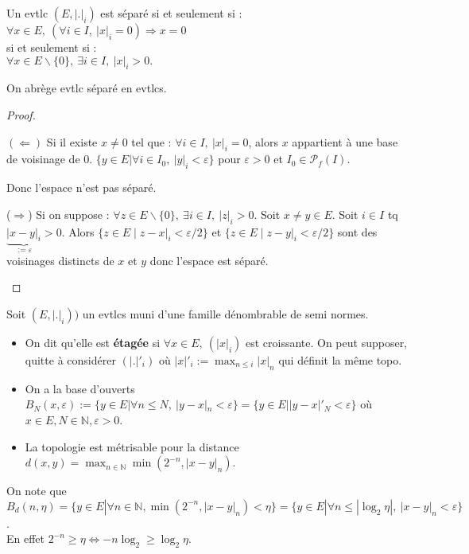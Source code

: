 \begin{lemme}\label{Lemme 1}
    Un evtlc $(E,|.|_i)$ est séparé si et seulement si : \\
    $\forall x\in E, \ (\forall i\in I,\ |x|_i=0)\Rightarrow x=0  $ \\
    si et seulement si : \\
    $\forall x\in E\backslash \{0\} ,\ \exists i\in I,\ |x|_i>0. $

    On abrège evtlc séparé en evtlcs.
\end{lemme}
\begin{proof}
    \begin{itemize}
        $(\Leftarrow)$ Si il existe $x \neq 0$ tel que : $\forall i\in I, \ |x|_i=0 $, alors $x$ appartient à une base de voisinage de $0$. $\{y\in E|\forall i\in I_0,\ |y|_i<\varepsilon  \}$ pour $\varepsilon>0$ et $I_0 \in \mathcal{P}_f(I)$. 
        
        Donc l'espace n'est pas séparé.
        
        ($\Rightarrow$) Si on suppose : $\forall z\in E\backslash \{0\} ,\ \exists i \in I,~ |z|_i>0$. Soit $x\neq y\in E$. Soit $i\in I$ tq $\underbrace{|x-y|_i}_{:=\varepsilon} >0$. Alors $\{z\in E\mid z-x|_i<\varepsilon /2\} $ et $\{z\in E\mid z-y|_i<\varepsilon /2\} $ sont des voisinages distincts de $x$ et $y$ donc l'espace est séparé.
    \end{itemize}
\end{proof}

Soit $(E,|.|_i))$ un evtlcs muni d'une famille dénombrable de semi normes.
\begin{itemize}
    \item On dit qu'elle est \textbf{étagée} si $\forall x\in E,\ (|x|_i) $ est croissante. On peut supposer, quitte à considérer $(|.|'_i)$ où $|x|'_i:=\max_{n\le i }|x|_n$ qui définit la même topo.
    \item On a la base d'ouverts $B_N(x,\varepsilon ):=\{y\in E|\forall n\le N,\ |y-x|_n<\varepsilon  \} =\{y\in E| |y-x|'_N<\varepsilon \} $ où $x\in E, N\in \mathbb{N} ,\varepsilon >0$.
    \item La topologie est métrisable pour la distance $d(x,y)=\max_{n\in \mathbb{N} }\min(2^{-n}, |x-y|_n)$.
\end{itemize}

On note que $B_d(n, \eta)=\{y\in E| \forall n\in \mathbb{N} , \min(2^{-n},|x-y|_n)< \eta\} =\{y\in E| \forall n\le |\log_2\eta|,\ |x-y|_n<\varepsilon  \} $.\\
En effet $2^{-n}\ge \eta\Leftrightarrow -n\log_2\ge  \log_2\eta$.\\

